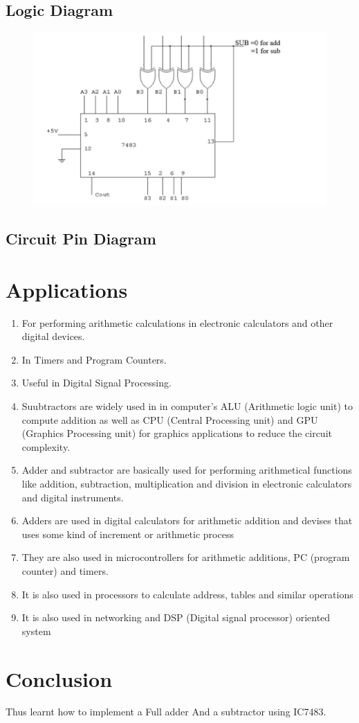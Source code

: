 \documentclass[11pt]{article}
\begin{document}
\subsection{Logic Diagram}

\begin{figure}[H]
\centering
\includegraphics[scale=0.5]{logic.png}
\caption{}
\end{figure}

\subsection{Circuit Pin Diagram}



\section{Applications}
\begin{enumerate}
	\item For performing arithmetic calculations in electronic calculators and other digital devices.
	\item In Timers and Program Counters.
	\item Useful in Digital Signal Processing.
	\item Suubtractors are widely used in in computer's ALU (Arithmetic logic unit) to compute addition as well as CPU (Central Processing unit) and GPU (Graphics Processing unit) for graphics applications to reduce the circuit complexity.
	\item Adder and subtractor are basically used for performing arithmetical functions like addition, subtraction, multiplication and division in electronic calculators and digital instruments.
	\item Adders are used in digital calculators for arithmetic addition and devises that uses some kind of increment or arithmetic process
	\item They are also used in microcontrollers for arithmetic additions, PC (program counter) and timers.
	\item It is also used in processors to calculate address, tables and similar operations
	\item It is also used in networking and DSP (Digital signal processor) oriented system
\end{enumerate}


\section{Conclusion}
Thus learnt how to implement a Full adder And a subtractor using IC7483. 
\end{document}
